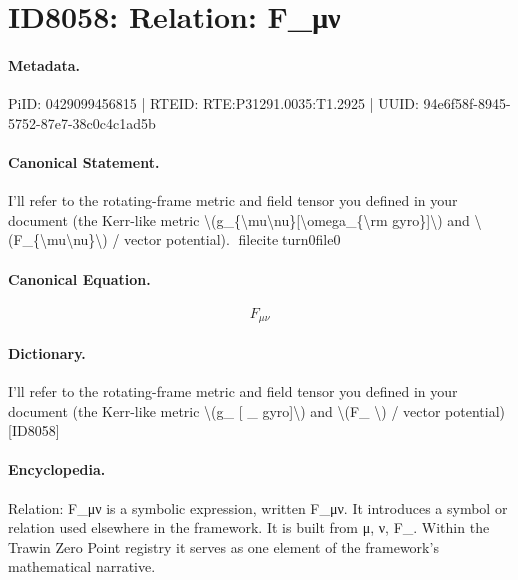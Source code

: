 \section*{ID8058: Relation: F\_μν}
\paragraph{Metadata.}
PiID: 0429099456815 | RTEID: RTE:P31291.0035:T1.2925 | UUID: 94e6f58f-8945-5752-87e7-38c0c4c1ad5b

\paragraph{Canonical Statement.}
I’ll refer to the rotating-frame metric and field tensor you defined in your document (the Kerr-like metric \textbackslash{}(g\_\{\textbackslash{}mu\textbackslash{}nu\}[\textbackslash{}omega\_\{\textbackslash{}rm gyro\}]\textbackslash{}) and \textbackslash{}(F\_\{\textbackslash{}mu\textbackslash{}nu\}\textbackslash{}) / vector potential). fileciteturn0file0

\paragraph{Canonical Equation.}
\[
F_{\mu\nu}
\]

\paragraph{Dictionary.}
I’ll refer to the rotating-frame metric and field tensor you defined in your document (the Kerr-like metric \textbackslash{}(g\_ [ \_ gyro]\textbackslash{}) and \textbackslash{}(F\_ \textbackslash{}) / vector potential) [ID8058]

\paragraph{Encyclopedia.}
Relation: F\_μν is a symbolic expression, written F\_μν. It introduces a symbol or relation used elsewhere in the framework. It is built from μ, ν, F\_. Within the Trawin Zero Point registry it serves as one element of the framework's mathematical narrative.
